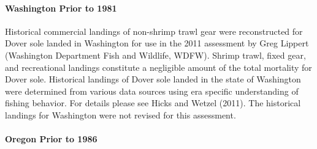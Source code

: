 \documentclass[11pt,
  english,
  a4paper,
]{article}
\begin{document}
\leavevmode\tagmcend\tagstructend\par


\hypertarget{washington-prior-to-1981}{%
\paragraph{Washington Prior to 1981}\label{washington-prior-to-1981}}

\leavevmode\tagmcend\tagstructend


Historical commercial landings of non-shrimp trawl gear were reconstructed for Dover sole landed in Washington for use in the 2011 assessment by Greg Lippert (Washington Department Fish and Wildlife, WDFW). Shrimp trawl, fixed gear, and recreational landings constitute a negligible amount of the total mortality for Dover sole. Historical landings of Dover sole landed in the state of Washington were determined from various data sources using era specific understanding of fishing behavior. For details please see Hicks and Wetzel {(2011)\leavevmode\tagmcend\tagstructend}. The historical landings for Washington were not revised for this assessment.

\leavevmode\tagmcend\tagstructend\par


\hypertarget{oregon-prior-to-1986}{%
\paragraph{Oregon Prior to 1986}\label{oregon-prior-to-1986}}

\leavevmode\tagmcend\tagstructend

\end{document}
